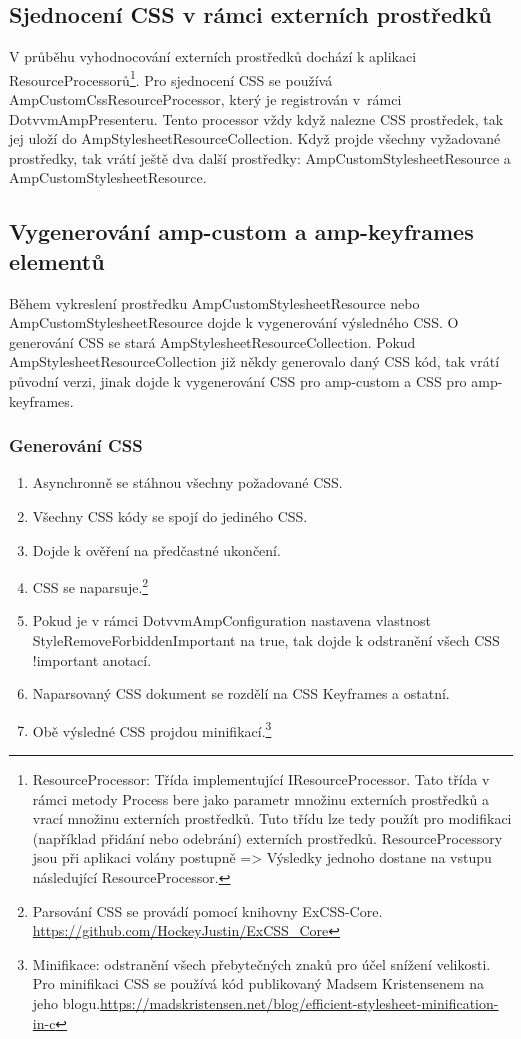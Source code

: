 \subsection*{Sjednocení CSS v rámci externích prostředků}
V průběhu vyhodnocování externích prostředků dochází k aplikaci ResourceProcessorů\footnote{ResourceProcessor: Třída implementující IResourceProcessor. Tato třída v rámci metody Process bere jako parametr množinu externích prostředků a vrací množinu externích prostředků. Tuto třídu lze tedy použít pro modifikaci (například přidání nebo odebrání) externích prostředků. ResourceProcessory jsou při aplikaci volány postupně => Výsledky jednoho dostane na vstupu následující ResourceProcessor.}. Pro sjednocení CSS se používá AmpCustomCssResourceProcessor, který je registrován v~rámci DotvvmAmpPresenteru. Tento processor vždy když nalezne CSS prostředek, tak jej uloží do AmpStylesheetResourceCollection. Když projde všechny vyžadované prostředky, tak vrátí ještě dva další prostředky: AmpCustomStylesheetResource a AmpCustomStylesheetResource.

\subsection*{Vygenerování amp-custom a amp-keyframes elementů}
Během vykreslení prostředku AmpCustomStylesheetResource nebo AmpCustomStylesheetResource dojde k vygenerování výsledného CSS. O generování CSS se stará AmpStylesheetResourceCollection. Pokud AmpStylesheetResourceCollection již někdy generovalo daný CSS kód, tak vrátí původní verzi, jinak dojde k vygenerování CSS pro amp-custom a CSS  pro amp-keyframes.

\subsubsection*{Generování CSS}
\begin{enumerate}
    \item Asynchronně se stáhnou všechny požadované CSS.
    \item Všechny CSS kódy se spojí do jediného CSS.
    \item Dojde k ověření na předčastné ukončení.
    \item CSS se naparsuje.\footnote{Parsování CSS se provádí pomocí knihovny ExCSS-Core. \newline \url{https://github.com/HockeyJustin/ExCSS_Core}}
    \item Pokud je v rámci DotvvmAmpConfiguration nastavena vlastnost StyleRemoveForbiddenImportant na true, tak dojde k odstranění všech CSS !important anotací. 
    \item Naparsovaný CSS dokument se rozdělí na CSS Keyframes a ostatní.
    \item Obě výsledné CSS projdou minifikací.\footnote{Minifikace: odstranění všech přebytečných znaků pro účel snížení velikosti. \newline Pro minifikaci CSS se používá kód publikovaný Madsem Kristensenem na jeho blogu.\newline \url{https://madskristensen.net/blog/efficient-stylesheet-minification-in-c}}
\end{enumerate}

